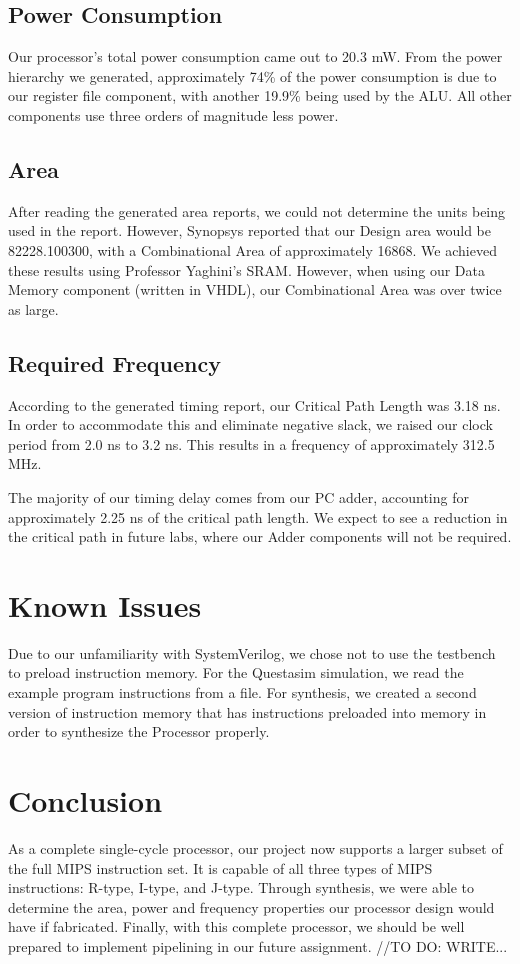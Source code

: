 \documentclass{article}
\begin{document}
\subsection{Power Consumption}
Our processor's total power consumption came out to 20.3 mW. From the power hierarchy we generated, approximately 74\% of the power consumption is due to our register file component, with another 19.9\% being used by the ALU. All other components use three orders of magnitude less power.

\subsection{Area}
After reading the generated area reports, we could not determine the units being used in the report. However, Synopsys reported that our Design area would be 82228.100300, with a Combinational Area of approximately 16868. We achieved these results using Professor Yaghini's SRAM. However, when using our Data Memory component (written in VHDL), our Combinational Area was over twice as large.

\subsection{Required Frequency}
According to the generated timing report, our Critical Path Length was 3.18 ns. In order to accommodate this and eliminate negative slack, we raised our clock period from 2.0 ns to 3.2 ns. This results in a frequency of approximately 312.5 MHz.

The majority of our timing delay comes from our PC adder, accounting for approximately 2.25 ns of the critical path length. We expect to see a reduction in the critical path in future labs, where our Adder components will not be required.

\section{Known Issues} 
Due to our unfamiliarity with SystemVerilog, we chose not to use the testbench to preload instruction memory. For the Questasim simulation, we read the example program instructions from a file.  For synthesis, we created a second version of instruction memory that has instructions preloaded into memory in order to synthesize the Processor properly.
\\
\section{Conclusion}

As a complete single-cycle processor, our project now supports a larger subset of the full MIPS instruction set. It is capable of all three types of MIPS instructions: R-type, I-type, and J-type. Through synthesis, we were able to determine the area, power and frequency properties our processor design would have if fabricated. Finally, with this complete processor, we should be well prepared to implement pipelining in our future assignment. //TO DO: WRITE...
\end{document}
